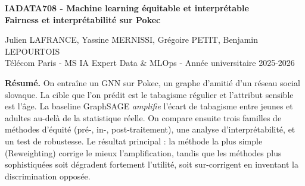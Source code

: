 \documentclass[10pt,a4paper,twocolumn]{article}
\begin{document}
\begin{strip}

\begin{center}


{\Large \textbf{IADATA708 - Machine learning équitable et interprétable}}\\[0.25cm]

{\huge \bfseries \color{darkgreen} Fairness et interprétabilité sur Pokec }\\[0.4cm]
\vspace{0.15cm}

{\Large
Julien LAFRANCE, Yassine MERNISSI, Grégoire PETIT, Benjamin LEPOURTOIS }\\[0.25cm]

{\large
Télécom Paris - MS IA Expert Data \& MLOps - Année universitaire 2025-2026
}\\[0.4cm]

\end{center}

\begin{tcolorbox}
\textbf{Résumé.} On entraîne un GNN sur Pokec, un graphe d'amitié d'un réseau social slovaque. La cible que l'on prédit est le tabagisme régulier et l'attribut sensible est l'âge. La baseline GraphSAGE \emph{amplifie} l'écart de tabagisme entre jeunes et adultes au-delà de la statistique réelle. On compare ensuite trois familles de méthodes d'équité (pré-, in-, post-traitement), une analyse d'interprétabilité, et un test de robustesse. Le résultat principal : la méthode la plus simple (Reweighting) corrige le mieux l'amplification, tandis que les méthodes plus sophistiquées soit dégradent fortement l'utilité, soit sur-corrigent en inventant la discrimination opposée.
\end{tcolorbox}

\vspace{0.05cm}
\end{strip}

\end{document}
